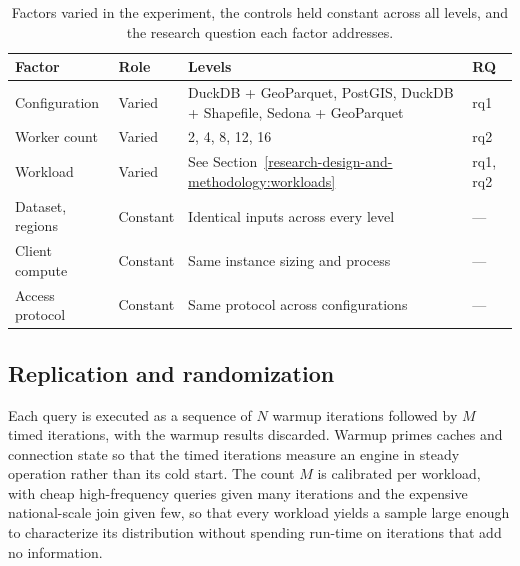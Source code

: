 \begin{table}[H]
    \centering
    \begin{tabular}{@{}l l p{6.5cm} l@{}}
        \toprule
        \textbf{Factor} & \textbf{Role} & \textbf{Levels} & \textbf{RQ} \\
        \midrule
        Configuration & Varied      & DuckDB + GeoParquet, PostGIS, DuckDB + Shapefile, Sedona + GeoParquet & \acrshort{rq}1 \\
        Worker count  & Varied      & 2, 4, 8, 12, 16 & \acrshort{rq}2 \\
        Workload      & Varied      & See Section~\ref{research-design-and-methodology:workloads} & \acrshort{rq}1, \acrshort{rq}2 \\
        \midrule
        Dataset, regions & Constant & Identical inputs across every level & --- \\
        Client compute   & Constant & Same instance sizing and process & --- \\
        Access protocol  & Constant & Same protocol across configurations & --- \\
        \bottomrule
    \end{tabular}
    \caption[Experimental factors and controls]{Factors varied in the experiment, the controls held constant across all levels, and the research question each factor addresses.}
    \label{tab:methodology:factors}
\end{table}

\subsection{Replication and randomization}
\label{research-design-and-methodology:overview-and-experimental-design:replication-and-randomization}

Each query is executed as a sequence of $N$ warmup iterations followed by $M$ timed iterations, with the warmup results discarded. Warmup primes caches and connection state so that the timed iterations measure an engine in steady operation rather than its cold start. The count $M$ is calibrated per workload, with cheap high-frequency queries given many iterations and the expensive national-scale join given few, so that every workload yields a sample large enough to characterize its distribution without spending run-time on iterations that add no information.

